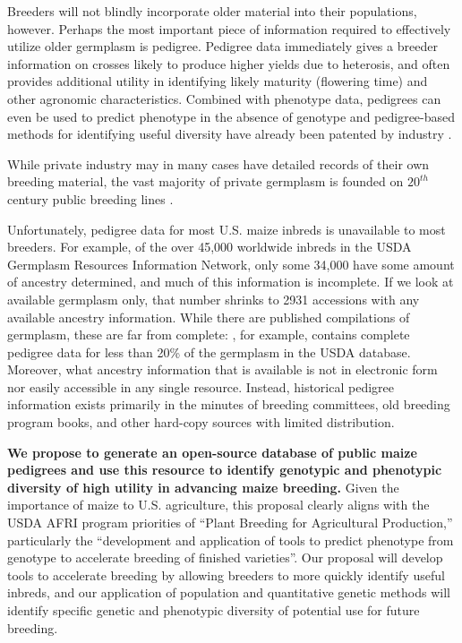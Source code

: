 \documentclass[12pt]{article}
\begin{document}
Breeders will not blindly incorporate older material into their populations, however.  
Perhaps the most important piece of information required to effectively utilize older germplasm is pedigree.
Pedigree data immediately gives a breeder information on crosses likely to produce higher yields due to heterosis, and often provides additional utility in identifying likely maturity (flowering time) and other agronomic characteristics. 
Combined with phenotype data, pedigrees can even be used to predict phenotype in the absence of genotype \citep{piepho2008blup} and pedigree-based methods for identifying useful diversity have already been patented by industry \citep{sebastian1995method}.

While private industry may in many cases have detailed records of their own breeding material, the vast majority of private germplasm is founded on $20^{th}$ century public breeding lines \citep{nelson2008molecular}.

Unfortunately, pedigree data for most U.S. maize inbreds is unavailable to most breeders. 
For example, of the over 45,000 worldwide inbreds in the USDA Germplasm Resources Information Network, only some 34,000 have some amount of ancestry determined, and much of this information is incomplete.
If we look at available germplasm only, that number shrinks to 2931 accessions with any available ancestry information.
While there are published compilations of germplasm, these are far from complete:  \citet{gerdes1993compilation}, for example, contains complete pedigree data for less than 20\% of the germplasm in the USDA database.
Moreover, what ancestry information that is available is not in electronic form nor easily accessible in any single resource.  
Instead, historical pedigree information exists primarily in the minutes of breeding committees, old breeding program books, and other hard-copy sources with limited distribution.  

\textbf{We propose to generate an open-source database of public maize pedigrees and use this resource to identify genotypic and phenotypic diversity of high utility in advancing maize breeding.}
Given the importance of maize to U.S. agriculture, this proposal clearly aligns with the USDA AFRI program priorities of ``Plant Breeding for Agricultural Production,'' particularly the ``development and application of tools to predict phenotype from genotype to accelerate breeding of finished varieties''.   
Our proposal will develop tools to accelerate breeding by allowing breeders to more quickly identify useful inbreds, and our application of population and quantitative genetic methods will identify specific genetic and phenotypic diversity of potential use for future breeding.  
\end{document}
